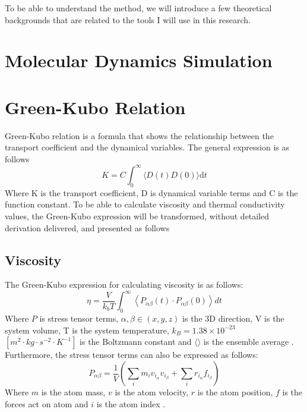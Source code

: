 To be able to understand the method, we will introduce a few theoretical 
backgrounds that are related to the tools I will use in this research.
\section{Molecular Dynamics Simulation}

\section{Green-Kubo Relation}
Green-Kubo relation is a formula that shows the relationship between the 
transport coefficient and the dynamical variables. 
The general expression is as follows \cite{hansen_theory_2013}
\begin{equation}
    K=C \int_{0}^{\infty}\langle D(t) D(0)\rangle \mathrm{d} t
\end{equation}
Where K is the transport coefficient, 
D is dynamical variable terms 
and C is the function constant. To be able to calculate viscosity and 
thermal conductivity values, the Green-Kubo expression will be transformed, 
without detailed derivation delivered, and presented as follows
\subsection{Viscosity}
The Green-Kubo expression for calculating viscosity is as follows:
\begin{equation}
    \eta=\frac{V}{k_{b} T} \int_{0}^{\infty}\left\langle P_{\alpha \beta}(t) \cdot P_{\alpha \beta}(0)\right\rangle d t
\end{equation}
Where $P$ is stress tensor terms, 
$\alpha,  \beta \in (x, y, z)$ is the 3D direction, 
V is the system volume, 
T is the system temperature, 
$k_B=1.38 \times 10^{-23}$ $[m^2\cdot kg\cdot s^{-2}\cdot K^{-1}]$ is the Boltzmann constant 
and $\langle \rangle$ is the ensemble average \cite{hansen_theory_2013}.\\
Furthermore, the stress tensor terms can also be expressed as follows:
\begin{equation}
    P_{\alpha \beta}=\frac{1}{V}\left(\sum_{i} m_{i} v_{i_{\alpha}} v_{i_{\beta}}+\sum_{i} r_{i_{\alpha}} f_{i_{\beta}}\right)
\end{equation}
Where $m$ is the atom mass, $v$ is the atom velocity, $r$ is the atom position, 
$f$ is the forces act on atom and $i$ is the atom index \cite{allen_time_2017}.
